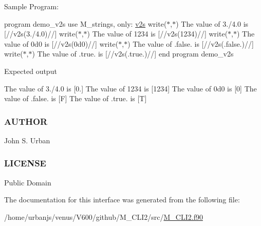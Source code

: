 Sample Program\+:

program demo\+\_\+v2s use M\+\_\+strings, only\+: \mbox{\hyperlink{interfacem__cli2_1_1v2s}{v2s}} write($\ast$,$\ast$) \textquotesingle{}The value of 3./4.0 is \mbox{[}\textquotesingle{}//v2s(3./4.0)//\textquotesingle{}\mbox{]}\textquotesingle{} write($\ast$,$\ast$) \textquotesingle{}The value of 1234 is \mbox{[}\textquotesingle{}//v2s(1234)//\textquotesingle{}\mbox{]}\textquotesingle{} write($\ast$,$\ast$) \textquotesingle{}The value of 0d0 is \mbox{[}\textquotesingle{}//v2s(0d0)//\textquotesingle{}\mbox{]}\textquotesingle{} write($\ast$,$\ast$) \textquotesingle{}The value of .false. is \mbox{[}\textquotesingle{}//v2s(.false.)//\textquotesingle{}\mbox{]}\textquotesingle{} write($\ast$,$\ast$) \textquotesingle{}The value of .true. is \mbox{[}\textquotesingle{}//v2s(.true.)//\textquotesingle{}\mbox{]}\textquotesingle{} end program demo\+\_\+v2s

Expected output

The value of 3./4.0 is \mbox{[}0.\mbox{]} The value of 1234 is \mbox{[}1234\mbox{]} The value of 0d0 is \mbox{[}0\mbox{]} The value of .false. is \mbox{[}F\mbox{]} The value of .true. is \mbox{[}T\mbox{]}

\subsubsection*{A\+U\+T\+H\+OR}

John S. Urban \subsubsection*{L\+I\+C\+E\+N\+SE}

Public Domain 

The documentation for this interface was generated from the following file\+:\begin{DoxyCompactItemize}
\item 
/home/urbanjs/venus/\+V600/github/\+M\+\_\+\+C\+L\+I2/src/\mbox{\hyperlink{M__CLI2_8f90}{M\+\_\+\+C\+L\+I2.\+f90}}\end{DoxyCompactItemize}
